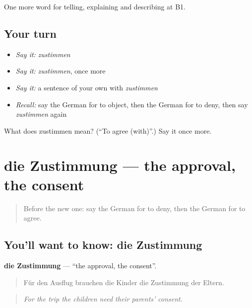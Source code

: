 \begin{grammarlens}[title={What you've built}]
One more word for telling, explaining and describing at B1.
\end{grammarlens}

\subsection*{Your turn}
\begin{itemize}
\raggedright
  \item \emph{Say it:} \emph{zustimmen}
  \item \emph{Say it:} \emph{zustimmen}, once more
  \item \emph{Say it:} a sentence of your own with \emph{zustimmen}
  \item \emph{Recall:} say the German for to object, then the German for to deny, then say \emph{zustimmen} again
\end{itemize}

\begin{tcolorbox}[breakable,colback=teal!4,colframe=teal!35!black,title={Before you move on}]
What does zustimmen mean? (\textquotedblleft{}To agree (with)\textquotedblright{}.) Say it once more.
\end{tcolorbox}
\section[die Zustimmung]{die Zustimmung — the approval, the consent}

\label{lesson:GE-C334-zustimmung}



\begin{quote}
Before the new one: say the German for to deny, then the German for to agree.
\end{quote}

\subsection*{You'll want to know: die Zustimmung}
\textbf{die Zustimmung} — \textquotedblleft{}the approval, the consent\textquotedblright{}.

\begin{quote}
Für den Ausflug brauchen die Kinder die Zustimmung der Eltern.
\end{quote}

\begin{quote}
\emph{For the trip the children need their parents' consent.}
\end{quote}

